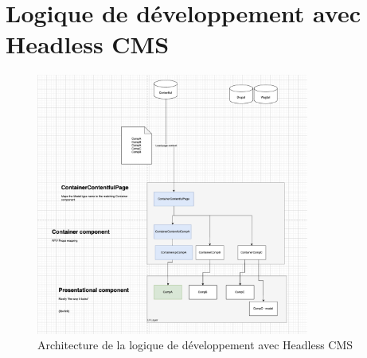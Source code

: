 \section{Logique de développement avec Headless CMS}
\begin{figure}[h] 
  \centering
  \includegraphics[width=0.8\textwidth]{Includes/Images/architecture.png}
  \caption{Architecture de la logique de développement avec Headless CMS}
  \label{fig: Architecture de la logique de développement avec Headless CMS}
\end{figure}

